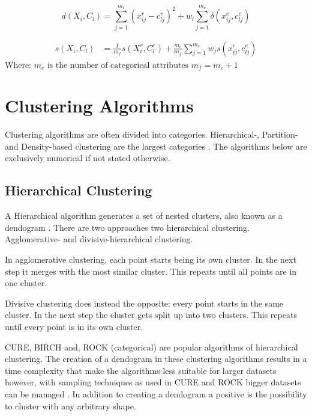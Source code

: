\documentclass[../report.tex]{subfiles}
\begin{document}
\begin{equation}
\label{eq:protodist}
d(X_i, C_l) = \sum_{j=1}^{m_r}( x_{ij}^{r} - c_{lj}^{r} )^2 +
  w_l \sum_{j=1}^{m_c}\delta( x_{ij}^c, c_{lj}^c )
\end{equation}

\begin{align}
\label{eq:mixJia}
s(X_{i},C_{l}) &= \frac{1}{m_f}s(X_{i}^r,C_{l}^r) + \frac{m_c}{m_f}\sum_{j = 1}^{m_c}{{w_j}s(x_{ij}^c,c_{lj}^c)}
\end{align}
Where:\newline
$m_c \text{ is the number of categorical attributes}$ \newline
$m_f = m_c + 1$




\section{Clustering Algorithms}
Clustering algorithms are often divided into categories. Hierarchical-, Partition- and Density-based clustering are the largest categories \cite{Xu2015}. The algorithms below are exclusively numerical if not stated otherwise.

\subsection{Hierarchical Clustering}
A Hierarchical algorithm generates a set of nested clusters, also known as a dendogram \cite{Xu2015, Jain1999}. There are two approaches two hierarchical clustering. Agglomerative- and divisive-hierarchical clustering.

In agglomerative clustering, each point starts being its own cluster. In the next step it merges with the most similar cluster. This repeats until all points are in one cluster.

Divisive clustering does instead the opposite: every point starts in the same cluster. In the next step the cluster gets split up into two clusters. This repeats until every point is in its own cluster.

CURE, BIRCH and, ROCK (categorical) are popular algorithms of hierarchical clustering. The creation of a dendogram in these clustering algorithms results in a time complexity that make the algorithms less suitable for larger datasets however, with sampling techniques as used in CURE and ROCK bigger datasets can be managed \cite{Xu2015,Jain1999}. In addition to creating a dendogram a positive is the possibility to cluster with any arbitrary shape. %
\end{document}
